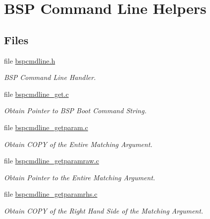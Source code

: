 \hypertarget{group__BSPCommandLine}{}\section{B\+SP Command Line Helpers}
\label{group__BSPCommandLine}
\subsection*{Files}
\begin{DoxyCompactItemize}
\item 
file \mbox{\hyperlink{bspcmdline_8h}{bspcmdline.\+h}}
\begin{DoxyCompactList}\small\item\em B\+SP Command Line Handler. \end{DoxyCompactList}\item 
file \mbox{\hyperlink{bspcmdline__get_8c}{bspcmdline\+\_\+get.\+c}}
\begin{DoxyCompactList}\small\item\em Obtain Pointer to B\+SP Boot Command String. \end{DoxyCompactList}\item 
file \mbox{\hyperlink{bspcmdline__getparam_8c}{bspcmdline\+\_\+getparam.\+c}}
\begin{DoxyCompactList}\small\item\em Obtain C\+O\+PY of the Entire Matching Argument. \end{DoxyCompactList}\item 
file \mbox{\hyperlink{bspcmdline__getparamraw_8c}{bspcmdline\+\_\+getparamraw.\+c}}
\begin{DoxyCompactList}\small\item\em Obtain Pointer to the Entire Matching Argument. \end{DoxyCompactList}\item 
file \mbox{\hyperlink{bspcmdline__getparamrhs_8c}{bspcmdline\+\_\+getparamrhs.\+c}}
\begin{DoxyCompactList}\small\item\em Obtain C\+O\+PY of the Right Hand Side of the Matching Argument. \end{DoxyCompactList}\end{DoxyCompactItemize}
